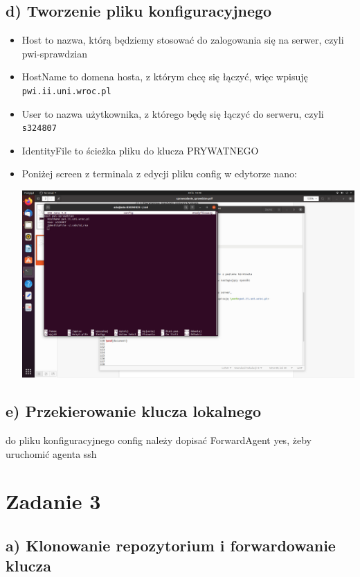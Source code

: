 \documentclass[a4paper, 11pt]{article}
\begin{document}
\subsection*{d) Tworzenie pliku konfiguracyjnego}
\begin{itemize}
\item \textsf{Host} to nazwa, którą będziemy stosować do zalogowania się na serwer, czyli \textsf{pwi-sprawdzian}
\item \textsf{HostName} to domena hosta, z którym chcę się łączyć, więc wpisuję \verb+pwi.ii.uni.wroc.pl+
\item \textsf{User} to nazwa użytkownika, z którego będę się łączyć do serweru, czyli \verb+s324807+
\item \textsf{IdentityFile} to ścieżka pliku do klucza PRYWATNEGO 
\item Poniżej screen z terminala z edycji pliku config w edytorze nano:


\noindent
\includegraphics[scale = 0.2]{edit_config.png}
\end{itemize}


\subsection*{e) Przekierowanie klucza lokalnego}

do pliku konfiguracyjnego \textsf{config} należy dopisać \textsf{ForwardAgent yes}, żeby uruchomić agenta ssh

\section*{Zadanie 3}

\subsection*{a) Klonowanie repozytorium i forwardowanie klucza}
\end{document}
